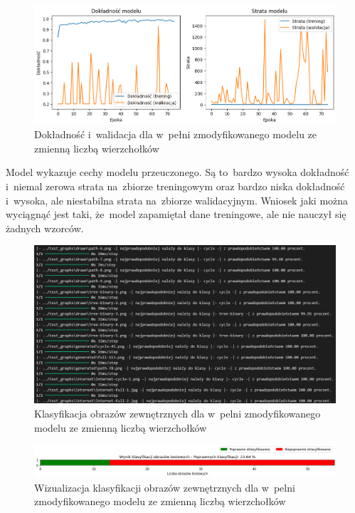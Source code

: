 \begin{figure}[ht]
	\centering
	\includegraphics[width=15.5cm]{resources/tests/images/v4/multiple_edges_img.png}
	\caption{Dokładność i~walidacja dla w~pełni zmodyfikowanego modelu ze zmienną liczbą wierzchołków}
	\label{Fig:tests-var-2a}
\end{figure}
\FloatBarrier

Model wykazuje cechy modelu przeuczonego.
Są to~bardzo wysoka dokładność i~niemal zerowa strata na~zbiorze treningowym
oraz bardzo niska dokładność i~wysoka, ale niestabilna strata na~zbiorze walidacyjnym.
Wniosek jaki można wyciągnąć jest taki, że~model zapamiętał dane treningowe, ale nie nauczył się żadnych wzorców.

\begin{figure}[ht]
	\centering
	\includegraphics[width=15.5cm]{resources/tests/images/v4/multiple_edges_txt.png}
	\caption{Klasyfikacja obrazów zewnętrznych dla w~pelni zmodyfikowanego modelu ze zmienną liczbą wierzchołków}
	\label{Fig:tests-var-2b}
\end{figure}
\FloatBarrier

\begin{figure}[ht]
	\centering
	\includegraphics[width=15.5cm]{resources/tests/images/v4/multiple_edges_bar.png}
	\caption{Wizualizacja klasyfikacji obrazów zewnętrznych dla w~pelni zmodyfikowanego modelu ze zmienną liczbą wierzchołków}
	\label{Fig:tests-var-2c}
\end{figure}
\FloatBarrier

